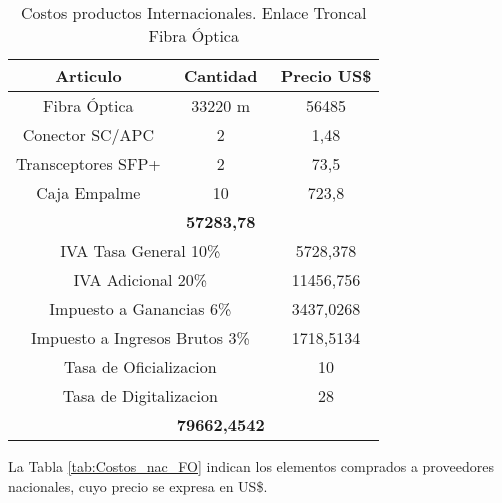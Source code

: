 \begin{table}[htbp]
  \centering
    \begin{tabular}{|c|c|c|}
    \hline
    \rowcolor[rgb]{ .773,  .851,  .945} \textbf{Articulo} & \textbf{Cantidad} & \textbf{Precio US\$} \bigstrut\\
    \hline
    \multicolumn{1}{|p{11.22em}|}{Fibra Óptica} & \multicolumn{1}{p{7.055em}|}{33220 m} & 56485 \bigstrut\\
    \hline
    \multicolumn{1}{|p{11.22em}|}{Conector SC/APC} & 2     & 1,48 \bigstrut\\
    \hline
    \multicolumn{1}{|p{11.22em}|}{Transceptores SFP+} & 2     & 73,5 \bigstrut\\
    \hline
    \multicolumn{1}{|p{11.22em}|}{Caja Empalme} & 10    & 723,8 \bigstrut\\
    \hline
    \rowcolor[rgb]{ .773,  .851,  .945} \multicolumn{2}{|c|}{\textbf{Costo}} & \textbf{57283,78} \bigstrut\\
    \hline
    \multicolumn{2}{|p{18.275em}|}{IVA Tasa General 10\%} & 5728,378 \bigstrut\\
    \hline
    \multicolumn{2}{|p{18.275em}|}{IVA Adicional 20\%} & 11456,756 \bigstrut\\
    \hline
    \multicolumn{2}{|p{18.275em}|}{Impuesto a Ganancias 6\%} & 3437,0268 \bigstrut\\
    \hline
    \multicolumn{2}{|p{18.275em}|}{Impuesto a Ingresos Brutos 3\%} & 1718,5134 \bigstrut\\
    \hline
    \multicolumn{2}{|p{18.275em}|}{Tasa de Oficializacion} & 10 \bigstrut\\
    \hline
    \multicolumn{2}{|p{18.275em}|}{Tasa de Digitalizacion} & 28 \bigstrut\\
    \hline
    \rowcolor[rgb]{ .773,  .851,  .945} \multicolumn{2}{|c|}{\textbf{Total}} & \textbf{79662,4542} \bigstrut\\
    \hline
    \end{tabular}%
    \caption{Costos productos Internacionales. Enlace Troncal Fibra Óptica}
  \label{tab:Costos_int_FO}%
\end{table}%



La Tabla \ref{tab:Costos_nac_FO} indican los elementos comprados a proveedores nacionales, cuyo precio se expresa en US\$. 



